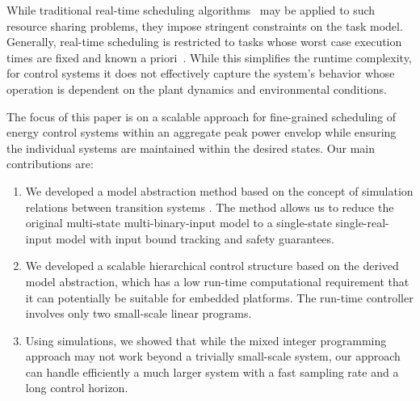 While traditional real-time scheduling algorithms~\cite{realtimesys} may be applied to such resource sharing problems, they impose stringent constraints on the task model.
Generally, real-time scheduling is restricted to tasks whose worst case execution times are fixed and known a priori~\cite{rts}.
While this simplifies the runtime complexity, for control systems it does not effectively capture the system's behavior whose operation is dependent on the plant dynamics and environmental conditions. 

The focus of this paper is on a scalable approach for fine-grained scheduling of energy control systems within an aggregate peak power envelop while ensuring the individual systems are maintained within the desired states.
Our main contributions are:
\begin{enumerate}
\item We developed a model abstraction method based on the concept of simulation relations between transition systems \cite{aluretal00dah,girardetal07amd}.  The method allows us to reduce the original multi-state multi-binary-input model to a single-state single-real-input model with input bound tracking and safety guarantees.
\item We developed a scalable hierarchical control structure based on the derived model abstraction, which has a low run-time computational requirement that it can potentially be suitable for embedded platforms.  The run-time controller involves only two small-scale linear programs.
\item Using simulations, we showed that while the mixed integer programming approach may not work beyond a trivially small-scale system, our approach can handle efficiently a much larger system with a fast sampling rate and a long control horizon.
\end{enumerate}
 

